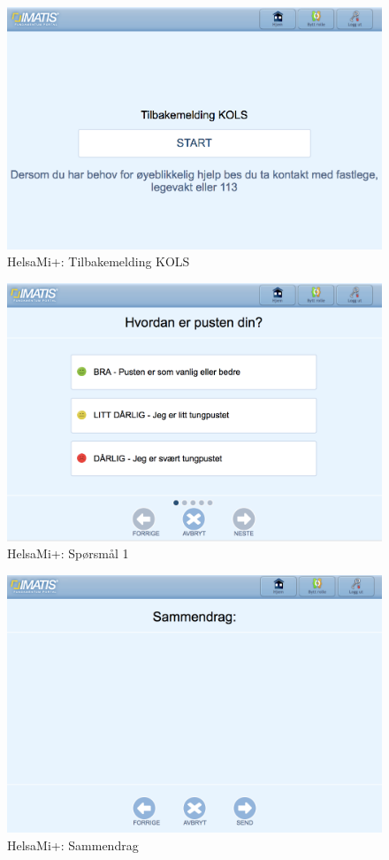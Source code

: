 \begin{figure}
\includegraphics[width=1.0\textwidth,center]{fig/helsami/kols_start}
\caption{HelsaMi+: Tilbakemelding KOLS}
\label{fig:helsami_kols_start}
\end{figure}

\begin{figure}
\includegraphics[width=1.0\textwidth,center]{fig/helsami/kols_sp1}
\caption{HelsaMi+: Spørsmål 1}
\label{fig:helsami_kols_sp1}
\end{figure}

\begin{figure}
\includegraphics[width=1.0\textwidth,center]{fig/helsami/kols_sammendrag}
\caption{HelsaMi+: Sammendrag}
\label{fig:helsami_kols_sammendrag}
\end{figure}

